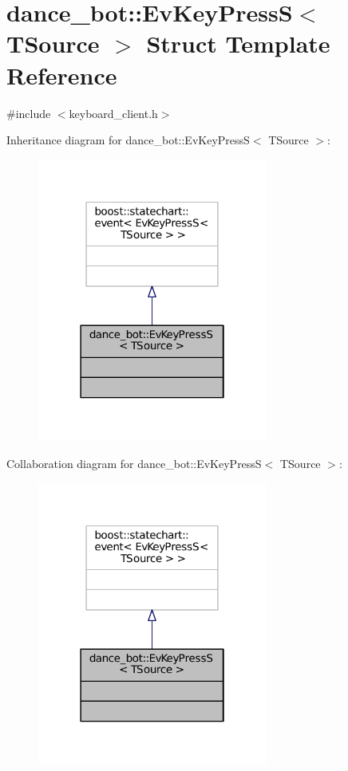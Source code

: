 \hypertarget{structdance__bot_1_1EvKeyPressS}{}\section{dance\+\_\+bot\+:\+:Ev\+Key\+PressS$<$ T\+Source $>$ Struct Template Reference}
\label{structdance__bot_1_1EvKeyPressS}


{\ttfamily \#include $<$keyboard\+\_\+client.\+h$>$}



Inheritance diagram for dance\+\_\+bot\+:\+:Ev\+Key\+PressS$<$ T\+Source $>$\+:
\nopagebreak
\begin{figure}[H]
\begin{center}
\leavevmode
\includegraphics[width=214pt]{structdance__bot_1_1EvKeyPressS__inherit__graph}
\end{center}
\end{figure}


Collaboration diagram for dance\+\_\+bot\+:\+:Ev\+Key\+PressS$<$ T\+Source $>$\+:
\nopagebreak
\begin{figure}[H]
\begin{center}
\leavevmode
\includegraphics[width=214pt]{structdance__bot_1_1EvKeyPressS__coll__graph}
\end{center}
\end{figure}


